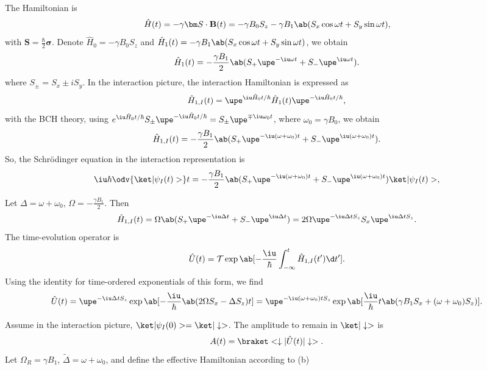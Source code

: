 \begin{solution}\leavevmode
  \begin{enumext}[label = (\alph*)]
    \item The Hamiltonian is
    \[
      \hat H(t) = -\gamma \bm S \cdot \mathbf{B}(t)
    = -\gamma B_0 S_z - \gamma B_1\ab(S_x \cos \omega t + S_y \sin \omega t),
    \]
    with $\bm S = \frac\hbar2 \bm \sigma$.
    Denote $\hat H_0 = -\gamma B_0 S_z$ and
    $\hat H_1(t) = -\gamma B_1\ab(S_x \cos \omega t + S_y \sin \omega t)$,
    we obtain
    \[
      \hat H_1(t) = -\frac{\gamma B_1}{2}
      \ab(S_+ \upe^{-\iu\omega t} + S_- \upe^{\iu\omega t}).
    \]
    where $S_\pm = S_x \pm i S_y$.
    In the interaction picture, the interaction Hamiltonian is expressed as
    \[
      \hat H_{1,I}(t) = \upe^{\iu\hat H_0 t/\hbar}
      \hat H_1(t) \upe^{-\iu\hat H_0 t/\hbar},
    \]
    with the BCH theory, using
    $e^{\iu\hat H_0 t/\hbar} S_\pm \upe^{-\iu\hat H_0 t/\hbar}
    = S_\pm \upe^{\mp \iu\omega_0 t}$, where $\omega_0 = \gamma B_0$,
    we obtain
    \[
      \hat H_{1,I}(t) = -\frac{\gamma B_1}{2}
      \ab(S_+ \upe^{-\iu(\omega + \omega_0) t}
        + S_- \upe^{\iu(\omega + \omega_0) t}).
    \]
    So, the Schr\"odinger equation in the interaction representation is
    \[
      \iu \hbar \odv{\ket|\psi_I(t)>}t = -\frac{\gamma B_1}{2}
      \ab(S_+ \upe^{-\iu(\omega + \omega_0) t}
        + S_- \upe^{\iu(\omega + \omega_0) t}) \ket|\psi_I(t)>,
    \]
    \item Let $\Delta = \omega + \omega_0$,
    $\Omega = -\frac{\gamma B_1}{2}$. Then
    \[
      \hat H_{1,I}(t)
    = \Omega\ab(S_+ \upe^{-\iu\Delta t} + S_- \upe^{\iu\Delta t})
    = 2\Omega \upe^{-\iu\Delta t S_z} S_x \upe^{\iu\Delta t S_z}.
    \]
    The time-evolution operator is
    \[
      \hat U(t) = \mathcal T
      \exp\ab[ -\frac\iu\hbar \int_{-\infty}^t \hat H_{1,I}(t') \d t'].
    \]
    Using the identity for time-ordered exponentials of this form, we find
    \[
      \hat U(t) = \upe^{-\iu\Delta t S_z} \exp\ab[
                  -\frac\iu\hbar \ab(2\Omega S_x - \Delta S_z) t]
                = \upe^{-\iu(\omega + \omega_0) t S_z}
                  \exp\ab[\frac\iu\hbar t
                      \ab(\gamma B_1 S_x + (\omega + \omega_0) S_z)].
    \]
    \item Assume in the interaction picture,
    $\ket|\psi_I(0)> = \ket|\downarrow>$.
    The amplitude to remain in $\ket|\downarrow>$ is
    \[
      A(t) = \braket<\downarrow|\hat U(t)|\downarrow>.
    \]
    Let $\Omega_R = \gamma B_1$, $\tilde{\Delta} = \omega + \omega_0$, and define the effective Hamiltonian according to (b)

\end{enumext}
\end{solution}
